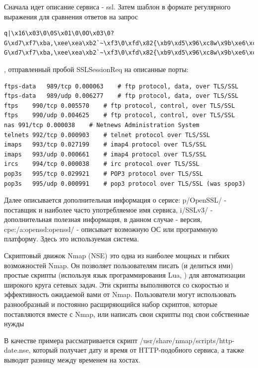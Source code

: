 \documentclass[12pt,a4paper]{report}
\begin{document}
Сначала идет описание сервиса - ssl. Затем шаблон в формате регулярного выражения для сравнения ответов на запрос
\begin{lstlisting}[breaklines]
 q|\x16\x03\0\0S\x01\0\0O\x03\0?G\xd7\xf7\xba,\xee\xea\xb2`~\xf3\0\xfd\x82{\xb9\xd5\x96\xc8w\x9b\xe6\xc4\xdb<=\xdbo\xef\x10n\0\0(\0\x16\0\x13\0\x0a\0f\0\x05\0\x04\0e\0d\0c\0b\0a\0`\0\x15\0\x12\0\x09\0\x14\0\x11\0\x08\0\x06\0\x03\x01\0|q|\x16\x03\0\0S\x01\0\0O\x03\0?G\xd7\xf7\xba,\xee\xea\xb2`~\xf3\0\xfd\x82{\xb9\xd5\x96\xc8w\x9b\xe6\xc4\xdb<=\xdbo\xef\x10n\0\0(\0\x16\0\x13\0\x0a\0f\0\x05\0\x04\0e\0d\0c\0b\0a\0`\0\x15\0\x12\0\x09\0\x14\0\x11\0\x08\0\x06\0\x03\x01\0|
\end{lstlisting}, отправленный пробой SSLSessionReq на описанные порты:
\begin{lstlisting}[breaklines]
ftps-data	989/tcp	0.000063	# ftp protocol, data, over TLS/SSL
ftps-data	989/udp	0.006277	# ftp protocol, data, over TLS/SSL
ftps	990/tcp	0.005570	# ftp protocol, control, over TLS/SSL
ftps	990/udp	0.004625	# ftp protocol, control, over TLS/SSL
nas	991/tcp	0.000038	# Netnews Administration System
telnets	992/tcp	0.000903	# telnet protocol over TLS/SSL
imaps	993/tcp	0.027199	# imap4 protocol over TLS/SSL
imaps	993/udp	0.000661	# imap4 protocol over TLS/SSL
ircs	994/tcp	0.000038	# irc protocol over TLS/SSL
pop3s	995/tcp	0.029921	# POP3 protocol over TLS/SSL
pop3s	995/udp	0.000991	# pop3 protocol over TLS/SSL (was spop3) 
\end{lstlisting}

Далее описывается дополнительная информация о серисе:
 p/OpenSSL/ - поставщик и наиболее часто употребляемое имя сервиса, i/SSLv3/ - дополнительная полезная информация, в данном случае - версия, cpe:/a:openssl:openssl/ - описывает возможную ОС или программную платформу. Здесь это используемая система.

Скриптовый движок Nmap (NSE) это одна из наиболее мощных и гибких возможностей Nmap. Он позволяет пользователям писать (и делиться ими) простые скрипты (используя язык программирования Lua, ) для автоматизации широкого круга сетевых задач. Эти скрипты выполняются со скоростью и эффективность ожидаемой вами от Nmap. Пользователи могут использовать разнообразный и постоянно расщиряющийся набор скриптов, которые поставляются вместе с Nmap, или написать свои скрипты под свои собственные нужды

В качестве примера рассматривается скрипт /usr/share/nmap/scripts/http-date.nse, который получает дату и время от HTTP-подобного сервиса, а также выводит разницу между временем на хостах.
\end{document}
